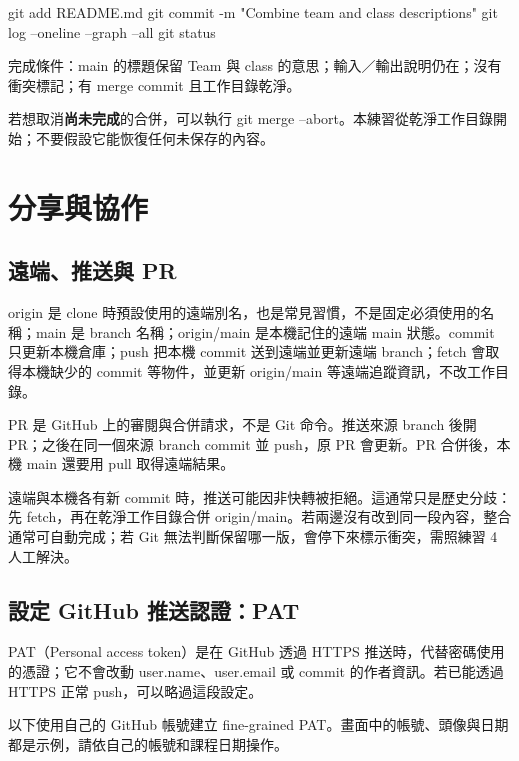 \documentclass[11pt,a4paper]{article}
\DeclareRobustCommand{\code}[1]{{\small\ttfamily #1}}
\begin{document}
\begin{Code}
git add README.md
git commit -m "Combine team and class descriptions"
git log --oneline --graph --all
git status
\end{Code}

完成條件：\code{main} 的標題保留 Team 與 class 的意思；輸入／輸出說明仍在；沒有衝突標記；有 merge commit 且工作目錄乾淨。

若想取消\textbf{尚未完成}的合併，可以執行 \code{git merge --abort}。本練習從乾淨工作目錄開始；不要假設它能恢復任何未保存的內容。

\section{分享與協作}

\subsection{遠端、推送與 PR}

\code{origin} 是 clone 時預設使用的遠端別名，也是常見習慣，不是固定必須使用的名稱；\code{main} 是 branch 名稱；\code{origin/main} 是本機記住的遠端 \code{main} 狀態。\code{commit} 只更新本機倉庫；\code{push} 把本機 commit 送到遠端並更新遠端 branch；\code{fetch} 會取得本機缺少的 commit 等物件，並更新 \code{origin/main} 等遠端追蹤資訊，不改工作目錄。

PR 是 GitHub 上的審閱與合併請求，不是 Git 命令。推送來源 branch 後開 PR；之後在同一個來源 branch commit 並 \code{push}，原 PR 會更新。PR 合併後，本機 \code{main} 還要用 \code{pull} 取得遠端結果。

遠端與本機各有新 commit 時，推送可能因非快轉被拒絕。這通常只是歷史分歧：先 \code{fetch}，再在乾淨工作目錄合併 \code{origin/main}。若兩邊沒有改到同一段內容，整合通常可自動完成；若 Git 無法判斷保留哪一版，會停下來標示衝突，需照練習 4 人工解決。

\subsection{設定 GitHub 推送認證：PAT}
\label{guide:pat}

PAT（Personal access token）是在 GitHub 透過 HTTPS 推送時，代替密碼使用的憑證；它不會改動 \code{user.name}、\code{user.email} 或 commit 的作者資訊。若已能透過 HTTPS 正常 \code{push}，可以略過這段設定。

以下使用自己的 GitHub 帳號建立 fine-grained PAT。畫面中的帳號、頭像與日期都是示例，請依自己的帳號和課程日期操作。
\end{document}
